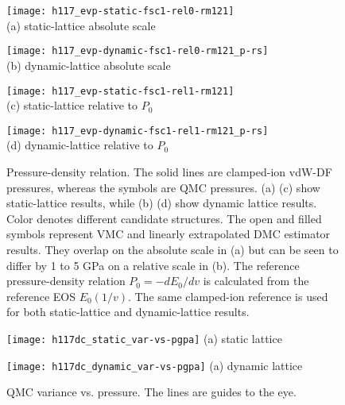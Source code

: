 \begin{figure}[h]
\centering
\begin{minipage}{0.49\textwidth}
\centering
\texttt{[image: h117\_evp-static-fsc1-rel0-rm121]}\\
(a) static-lattice absolute scale
\end{minipage}
\begin{minipage}{0.49\textwidth}
\centering
\texttt{[image: h117\_evp-dynamic-fsc1-rel0-rm121\_p-rs]}\\
(b) dynamic-lattice absolute scale
\end{minipage}
\begin{minipage}{0.49\textwidth}
\centering
\texttt{[image: h117\_evp-static-fsc1-rel1-rm121]}\\
(c) static-lattice relative to $P_0$
\end{minipage}
\begin{minipage}{0.49\textwidth}
\centering
\texttt{[image: h117\_evp-dynamic-fsc1-rel1-rm121\_p-rs]}\\
(d) dynamic-lattice relative to $P_0$
\end{minipage}
\caption{Pressure-density relation. The solid lines are clamped-ion vdW-DF pressures, whereas the symbols are QMC pressures. (a) (c) show static-lattice results, while (b) (d) show dynamic lattice results. Color denotes different candidate structures. The open and filled symbols represent VMC and linearly extrapolated DMC estimator results. They overlap on the absolute scale in (a) but can be seen to differ by 1 to 5 GPa on a relative scale in (b). The reference pressure-density relation $P_0=-dE_0/dv$ is calculated from the reference EOS $E_0(1/v)$. The same clamped-ion reference is used for both static-lattice and dynamic-lattice results.}
\label{fig:hsolid-p-vs-n}
\end{figure}

\begin{figure}[h]
\centering
\begin{minipage}{0.49\linewidth}
\centering
\texttt{[image: h117dc\_static\_var-vs-pgpa]}
(a) static lattice
\end{minipage}
\centering
\begin{minipage}{0.49\linewidth}
\centering
\texttt{[image: h117dc\_dynamic\_var-vs-pgpa]}
(a) dynamic lattice
\end{minipage}
\caption{QMC variance vs. pressure. The lines are guides to the eye.}
\label{fig:hsolid-v-vs-p}
\end{figure}

